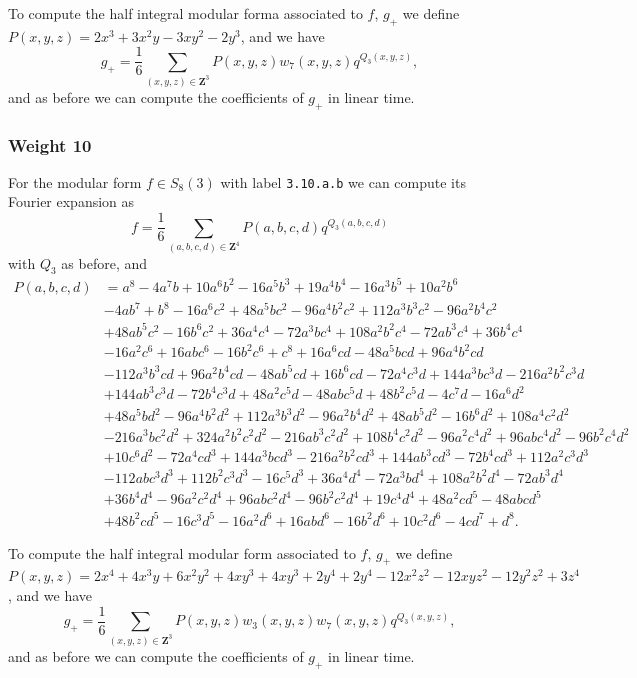 \documentclass[11pt]{amsart}
\newcommand{\Z}{\ensuremath{\mathbf{Z}}}
\begin{document}
To compute the half integral modular forma associated to $f$, $g_+$ we define
$P(x, y, z) = 2x^3 + 3x^2y - 3xy^2 - 2y^3$,
and we have
\[
g_+ = \frac{1}{6}\sum_{(x, y, z)\in\Z^3}P(x, y, z)w_7(x, y, z)q^{Q_3(x, y, z)},
\]
and as before we can compute the coefficients of $g_+$ in linear time.

\subsubsection{Weight 10}
For the modular form $f\in S_8(3)$ with label \texttt{3.10.a.b} we can compute its Fourier expansion as
\[f = \frac{1}{6}\sum_{(a, b, c, d)\in\Z^4}P(a, b, c, d)q^{Q_3(a, b, c, d)}\]
with $Q_3$ as before, and
\begin{align*}
P(a, b, c, d) &= a^8 - 4a^7b + 10a^6b^2 - 16a^5b^3 + 19a^4b^4 - 16a^3b^5 + 10a^2b^6\\
& - 4ab^7 + b^8 - 16a^6c^2 + 48a^5bc^2 - 96a^4b^2c^2 + 112a^3b^3c^2 - 96a^2b^4c^2 \\
& + 48ab^5c^2 - 16b^6c^2 + 36a^4c^4 - 72a^3bc^4 + 108a^2b^2c^4 - 72ab^3c^4 + 36b^4c^4\\
& - 16a^2c^6 + 16abc^6 - 16b^2c^6 + c^8 + 16a^6cd - 48a^5bcd + 96a^4b^2cd  \\
& -112a^3b^3cd + 96a^2b^4cd - 48ab^5cd + 16b^6cd - 72a^4c^3d + 144a^3bc^3d - 216a^2b^2c^3d\\
& + 144ab^3c^3d - 72b^4c^3d + 48a^2c^5d - 48abc^5d + 48b^2c^5d - 4c^7d - 16a^6d^2\\
& + 48a^5bd^2 - 96a^4b^2d^2 + 112a^3b^3d^2 - 96a^2b^4d^2 + 48ab^5d^2 - 16b^6d^2 + 108a^4c^2d^2\\
& - 216a^3bc^2d^2 + 324a^2b^2c^2d^2 - 216ab^3c^2d^2 + 108b^4c^2d^2 - 96a^2c^4d^2 + 96abc^4d^2 - 96b^2c^4d^2\\
& + 10c^6d^2 - 72a^4cd^3 + 144a^3bcd^3 - 216a^2b^2cd^3 + 144ab^3cd^3 - 72b^4cd^3 + 112a^2c^3d^3 \\
&- 112abc^3d^3 + 112b^2c^3d^3 - 16c^5d^3 + 36a^4d^4 - 72a^3bd^4 + 108a^2b^2d^4 - 72ab^3d^4\\
&+ 36b^4d^4 - 96a^2c^2d^4 + 96abc^2d^4 - 96b^2c^2d^4 + 19c^4d^4 + 48a^2cd^5 - 48abcd^5\\
& + 48b^2cd^5 - 16c^3d^5 - 16a^2d^6 + 16abd^6 - 16b^2d^6 + 10c^2d^6 - 4cd^7 + d^8.
\end{align*}

To compute the half integral modular form associated to $f$, $g_+$ we define
$P(x, y, z) = 2x^4+4x^3y+6x^2y^2+4xy^3+4xy^3+2y^4+2y^4-12x^2z^2-12xyz^2-12y^2z^2+3z^4$,
and we have
\[
g_+ = \frac{1}{6}\sum_{(x, y, z)\in\Z^3}P(x, y, z)w_3(x, y, z)w_7(x, y, z)q^{Q_3(x, y, z)},
\]
and as before we can compute the coefficients of $g_+$ in linear time.
\end{document}
